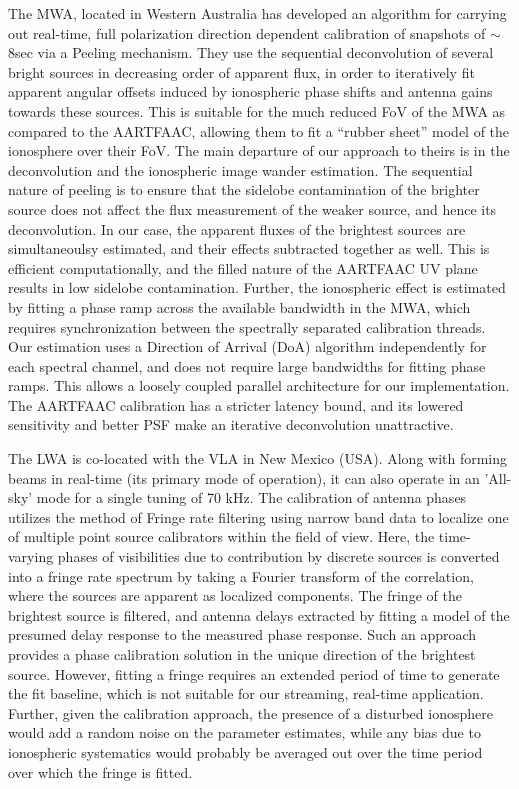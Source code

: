 \documentclass{aa}
\begin{document}
The MWA\citep{lonsdale2009murchison}, located in Western Australia has developed
an algorithm  for carrying out real-time, full  polarization direction dependent
calibration     of     snapshots     of     $\sim$8sec     via     a     Peeling
mechanism\citep{mitchell2008real}.   They use  the  sequential deconvolution  of
several  bright  sources in  decreasing  order of  apparent  flux,  in order  to
iteratively fit apparent angular offsets induced by ionospheric phase shifts and
antenna gains towards  these sources. This is suitable for  the much reduced FoV
of the MWA as compared to the  AARTFAAC, allowing them to fit a ``rubber sheet''
model of the  ionosphere over their FoV.  The main departure  of our approach to
theirs is in the deconvolution and the ionospheric image wander estimation.  The
sequential nature of peeling is to ensure that the sidelobe contamination of the
brighter source does  not affect the flux measurement of  the weaker source, and
hence  its deconvolution.  In  our case,  the apparent  fluxes of  the brightest
sources are  simultaneoulsy estimated, and their effects  subtracted together as
well. This is  efficient computationally, and the filled  nature of the AARTFAAC
UV plane results in low  sidelobe contamination. Further, the ionospheric effect
is estimated by fitting a phase  ramp across the available bandwidth in the MWA,
which  requires  synchronization between  the  spectrally separated  calibration
threads.   Our   estimation  uses  a   Direction  of  Arrival   (DoA)  algorithm
independently for each  spectral channel, and does not  require large bandwidths
for fitting  phase ramps.  This  allows a loosely coupled  parallel architecture
for our implementation.  The AARTFAAC  calibration has a stricter latency bound,
and  its lowered  sensitivity and  better  PSF make  an iterative  deconvolution
unattractive.

The  LWA\citep{ellingsonLWA1}   is  co-located  with  the  VLA   in  New  Mexico
(USA). Along with forming beams in real-time (its primary mode of operation), it
can  also operate  in an  'All-sky' mode  for  a single  tuning of  70 kHz.  The
calibration of antenna phases utilizes the method of Fringe rate filtering using
narrow band data to localize one of multiple point source calibrators within the
field of view. Here, the time-varying phases of visibilities due to contribution
by discrete sources is converted into a fringe rate spectrum by taking a Fourier
transform  of the  correlation,  where  the sources  are  apparent as  localized
components. The fringe  of the brightest source is  filtered, and antenna delays
extracted by  fitting a  model of  the presumed delay  response to  the measured
phase response.  Such an approach provides  a phase calibration  solution in the
unique direction of the brightest source.  However, fitting a fringe requires an
extended period of time to generate  the fit baseline, which is not suitable for
our streaming, real-time application.  Further, given the calibration approach,
the presence of a disturbed ionosphere would add a random noise on the parameter
estimates,  while any  bias due  to  ionospheric systematics  would probably  be
averaged out over the time period over which the fringe is fitted.
\end{document}
